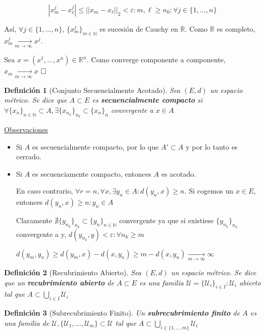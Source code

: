\documentclass[10pt,a4paper,openright]{book}
\theoremstyle{break}
\newtheorem*{defi}{Definición}
\begin{document}
$$|x_m^j - x_\ell^j| \leq ||x_m - x_\ell ||_2 < \varepsilon : m,\ell \geq n_0 : \forall j \in \{ 1, \ldots,n\}$$

Así, $\forall j \in \{ 1, \ldots,n\}$, $\{x_m^j\}_{m \in \mathbb{N}}$ es sucesión de Cauchy en $\mathbb{R}$. Como $\mathbb{R}$ es completo, $x_m^j \xrightarrow[m\rightarrow\infty]{} x^j$.

Sea $x=(x^1, \ldots, x^n) \in \mathbb{R}^n$. Como converge componente a componente, $x_m \xrightarrow[m\rightarrow\infty]{} x$
$\hfill \square$

\begin{defi}[Conjunto Secuencialmente Acotado]
Sea $(E,d)$ un espacio métrico. Se dice que $A \subset E$ es \textbf{secuencialmente compacto} si $\forall \{x_n\}_{n \in \mathbb{N}} \subset A, \exists \{ x_{n_k}\}_{n_k} \subset \{ x_n\}_n$ convergente a $x \in A$
\end{defi}

\underline{Observaciones}

\begin{itemize}
\item Si $A$ es secuencialmente compacto, por lo que $A' \subset A$ y por lo tanto es cerrado.

\item Si $A$ es secuenciamente compacto, entonces $A$ es acotado. 

En caso contrario, $\forall r = n, \forall x, \exists y_n \in A : d(y_n,x) \geq n$. Si cogemos un $x \in E$, entonces $d(y_n , x) \geq n : y_n \in A$

Claramente $\nexists \{ y_{n_k}\}_{n_k} \subset \{ y_n\}_{n \in \mathbb{N}}$ convergente ya que si existiese $\{ y_{n_k}\}_{n_k}$ convergente a y, $d(y_{n_k}, y) < \varepsilon : \forall n_k \geq m$

$d(y_m, y_n) \geq d(y_m,x) - d(x, y_n) \geq m - d(x, y_n) \xrightarrow[m\rightarrow\infty]{} \infty$

\end{itemize}


\begin{defi}[Recubrimiento Abierto]
Sea $(E,d)$ un espacio métrico. Se dice que un \textbf{recubrimiento abierto} de $A \subset E$ es una familia $\mathcal{U} = \{ \mathcal{U}_i\}_{i \in I} : \mathcal{U}_i$ abierto tal que $A \subset \bigcup_{i \in I} \mathcal{U}_i$
\end{defi}

\begin{defi}[Subrecubrimiento Finito]
Un \textbf{subrecubrimiento finito} de $A$ es una familia de $\mathcal{U}, \{ \mathcal{U}_1, \ldots, \mathcal{U}_m\} \subset \mathcal{U}$ tal que $A \subset \bigcup_{i \in \{1,\ldots,m\}} \mathcal{U}_i$
\end{defi}
\end{document}
